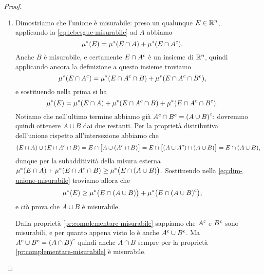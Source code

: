 \begin{proof}
	\begin{enumerate}
		\item Dimostriamo che l'unione è misurabile: preso un qualunque $E\in\mathbb{R}^n$, applicando la \eqref{eq:lebesgue-misurabile} ad $A$ abbiamo
			\begin{equation}
				\mu^*(E)=\mu^*(E\cap A)+\mu^*(E\cap{A}^c).
			\end{equation}
			Anche $B$ è misurabile, e certamente $E\cap{A}^c$ è un insieme di $\mathbb{R}^n$, quindi applicando ancora la definizione a questo insieme troviamo
			\begin{equation}
				\mu^*(E\cap{A}^c)=\mu^*(E\cap{A}^c\cap B)+\mu^*(E\cap{A}^c\cap{B}^c),
			\end{equation}
			e sostituendo nella prima si ha
			\begin{equation}
				\mu^*(E)=\mu^*(E\cap A)+\mu^*(E\cap{A}^c\cap B)+\mu^*(E\cap{A}^c\cap{B}^c).
				\label{eq:dim-unione-misurabile}
			\end{equation}
			Notiamo che nell'ultimo termine abbiamo già ${A}^c\cap{B}^c={(A\cup B)}^c$: dovremmo quindi ottenere $A\cup B$ dai due restanti.
			Per la proprietà distributiva dell'unione rispetto all'intersezione abbiamo che
			\begin{equation}
				(E\cap A)\cup(E\cap{A}^c\cap B)=E\cap\big[A\cup({A}^c\cap B)\big]=E\cap\big[(A\cup{A}^c)\cap(A\cup B)\big]=E\cap(A\cup B),
			\end{equation}
			dunque per la subadditività della misura esterna $\mu^*(E\cap A)+\mu^*(E\cap{A}^c\cap B)\geq\mu^*\big(E\cap(A\cup B)\big)$.
			Sostituendo nella \eqref{eq:dim-unione-misurabile} troviamo allora che
			\begin{equation}
				\mu^*(E)\geq\mu^*\big(E\cap(A\cup B)\big)+\mu^*\big(E\cap{(A\cup B)}^c\big),
			\end{equation}
			e ciò prova che $A\cup B$ è misurabile.
			
			Dalla proprietà \ref{pr:complementare-misurabile} sappiamo che ${A}^c$ e ${B}^c$ sono misurabili, e per quanto appena visto lo è anche ${A}^c\cup{B}^c$.
			Ma ${A}^c\cup{B}^c={(A\cap B)}^c$ quindi anche $A\cap B$ sempre per la proprietà \ref{pr:complementare-misurabile} è misurabile.


\end{enumerate}
\end{proof}
